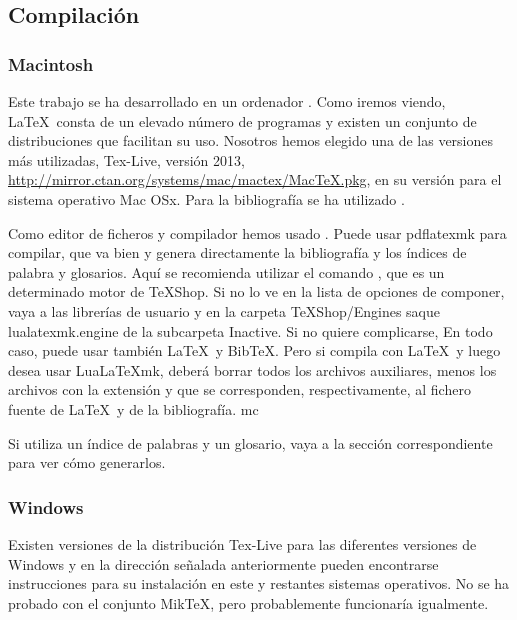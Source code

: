 \subsection{Compilación}

\subsubsection{{Macintosh}\tsp{\textregistered}}
Este trabajo se ha desarrollado en un ordenador \tsp{\textregistered}. Como iremos viendo, \LaTeX\ consta de un elevado número de programas y existen un conjunto de distribuciones que facilitan su uso. Nosotros hemos elegido una de las versiones más utilizadas, Tex-Live, versión 2013, \url{http://mirror.ctan.org/systems/mac/mactex/MacTeX.pkg}, en su versión para el sistema operativo Mac OSx\tsp{\textregistered}. Para la bibliografía  se ha utilizado . 

Como editor de ficheros y compilador hemos usado \tsp{\textregistered}. Puede usar pdflatexmk para
compilar, que va bien y genera directamente la bibliografía y los índices de palabra y glosarios. Aquí se recomienda
utilizar el comando , que es un determinado motor  de TeXShop\tsp{\textregistered}. Si
no lo ve en la lista de opciones de componer, vaya a las librerías de usuario y en la carpeta TeXShop/Engines saque
lualatexmk.engine de la subcarpeta Inactive. Si no quiere complicarse,  En todo caso, puede usar también \LaTeX\ y
BibTeX. Pero si compila con \LaTeX\ y luego desea usar Lua\LaTeX mk, deberá borrar todos los archivos auxiliares, menos
los archivos con la extensión  y  que se corresponden, respectivamente, al fichero fuente de
\LaTeX\ y de la bibliografía. \acrfull{mc}

Si utiliza un índice de palabras y un glosario, vaya a la sección correspondiente para ver cómo generarlos.

\subsubsection{Windows\tsp{\textregistered}}

Existen versiones de la distribución Tex-Live para las diferentes versiones de Windows\tsp{\textregistered} y en la dirección señalada anteriormente pueden encontrarse instrucciones para su instalación en este y restantes sistemas operativos. No se ha probado con el conjunto MikTeX, pero probablemente funcionaría igualmente.

